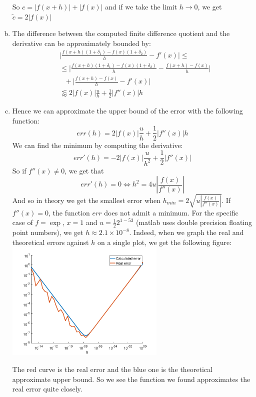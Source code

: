 \documentclass{article}
\begin{document}
\begin{enumerate}[(a)]
      So $c = |f(x + h)| + |f(x)|$ and if we take the limit
      $h \to 0$, we get $\tilde{c} = 2|f(x)|$
   \item 
      The difference between the computed finite difference quotient and the 
      derivative can be approximately bounded by:
      \begin{align*}
         &\Bigg|\frac{f(x+h)(1 + \delta_1) - f(x)(1 + \delta_2)}{h}
         - f'(x)\Bigg| \leq \\
         &\leq 
         \Bigg|\frac{f(x+h)(1 + \delta_1) - f(x)(1 + \delta_2)}{h} -
         \frac{f(x+h) - f(x)}{h}\Bigg| \\
         &~~~+ \Bigg|\frac{f(x+h) - f(x)}{h} - f'(x)\Bigg| \\
         &\lessapprox 2|f(x)|\frac{u}{h} + \frac{1}{2}|f''(x)|h
      \end{align*}
   \item
      Hence we can approximate the upper bound of the error with the following function:
      \begin{equation}
         err(h) = 2|f(x)|\frac{u}{h} + \frac{1}{2}|f''(x)|h
      \end{equation}
      We can find the minimum by computing the derivative:
      \begin{equation}
         err'(h) = -2|f(x)|\frac{u}{h^2} + \frac{1}{2}|f''(x)|
      \end{equation}
      So if $f''(x) \neq 0$, we get that
      \begin{equation}
         err'(h) = 0 \iff h^2 = 4u\left|\frac{f(x)}{f''(x)}\right|
      \end{equation}
      And so in theory we get the smallest error when
      $h_{min} = 2\sqrt{u\left|\frac{f(x)}{f''(x)}\right|}$.
      If $f''(x) = 0$, the function $err$ does not admit a minimum.
      For the specific case of $f = \exp$, $x = 1$ and
      $u = \frac{1}{2}2^{1 - 53}$ (matlab uses double precision floating
      point numbers), we get $h \approx 2.1 \times 10^{-8}$.
      Indeed, when we graph the real and theoretical errors against $h$ on a single plot, we
      get the following figure:\\
      \includegraphics[width=0.6\textwidth]{figure}

      The red curve is the real error and the blue one is the
		theoretical approximate upper bound.
      So we see the function we found approximates the real error
		quite closely.
\end{enumerate}
\end{document}
